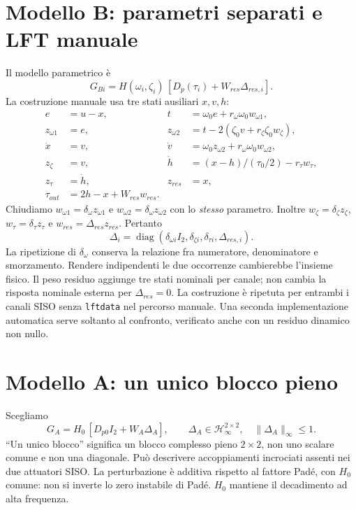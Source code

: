 \section{Modello B: parametri separati e LFT manuale}
Il modello parametrico è
\[
G_{Bi}=H(\omega_i,\zeta_i)\,[D_p(\tau_i)+W_{res}\Delta_{res,i}].
\]
La costruzione manuale usa tre stati ausiliari $x,v,h$:
\begin{align*}
e&=u-x,& t&=\omega_0e+r_\omega\omega_0w_{\omega1},\\
z_{\omega1}&=e,& z_{\omega2}&=t-2(\zeta_0v+r_\zeta\zeta_0w_\zeta),\\
\dot x&=v,&\dot v&=\omega_0z_{\omega2}+r_\omega\omega_0w_{\omega2},\\
z_\zeta&=v,&\dot h&=(x-h)/(\tau_0/2)-r_\tau w_\tau,\\
z_\tau&=\dot h,&z_{res}&=x,\\
\tau_{out}&=2h-x+W_{res}w_{res}.&&
\end{align*}
Chiudiamo $w_{\omega1}=\delta_\omega z_{\omega1}$ e
$w_{\omega2}=\delta_\omega z_{\omega2}$ con lo \emph{stesso} parametro.
Inoltre $w_\zeta=\delta_\zeta z_\zeta$, $w_\tau=\delta_\tau z_\tau$ e
$w_{res}=\Delta_{res}z_{res}$. Pertanto
\[
\Delta_i=\operatorname{diag}(\delta_{\omega i}I_2,\delta_{\zeta i},\delta_{\tau i},\Delta_{res,i}).
\]
La ripetizione di $\delta_\omega$ conserva la relazione fra numeratore,
denominatore e smorzamento. Rendere indipendenti le due occorrenze
cambierebbe l'insieme fisico. Il peso residuo aggiunge tre stati nominali
per canale; non cambia la risposta nominale esterna per $\Delta_{res}=0$.
La costruzione è ripetuta per entrambi i canali SISO senza \texttt{lftdata}
nel percorso manuale. Una seconda implementazione automatica serve soltanto
al confronto, verificato anche con un residuo dinamico non nullo.
\section{Modello A: un unico blocco pieno}
Scegliamo
\[
G_A=H_0\,[D_{p0}I_2+W_A\Delta_A],\qquad
\Delta_A\in\mathcal{H}_\infty^{2\times2},\quad\|\Delta_A\|_\infty\le1.
\]
``Un unico blocco'' significa un blocco complesso pieno $2\times2$,
non uno scalare comune e non una diagonale. Può descrivere accoppiamenti
incrociati assenti nei due attuatori SISO. La perturbazione è additiva
rispetto al fattore Padé, con $H_0$ comune: non si inverte lo zero instabile
di Padé. $H_0$ mantiene il decadimento ad alta frequenza.
